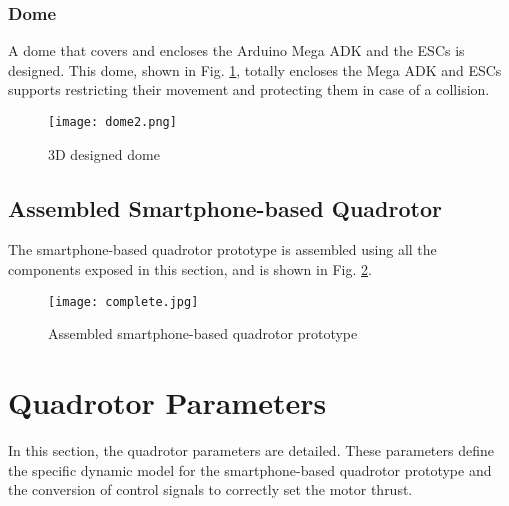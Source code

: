 \subsubsection{Dome}
A dome that covers and encloses the Arduino Mega ADK and the ESCs is designed. This dome, shown in Fig. \ref{fig:dome}, totally encloses the Mega ADK and ESCs supports restricting their movement and protecting them in case of a collision.
\begin{figure}[H]
	\begin{center}
		\texttt{[image: dome2.png]}    
		\caption{3D designed dome} 
		\label{fig:dome}
	\end{center}
\end{figure}

\subsection{Assembled Smartphone-based Quadrotor}
The smartphone-based quadrotor prototype is assembled using all the components exposed in this section, and is shown in Fig. \ref{fig:completequad}.
\begin{figure}[H]
	\begin{center}
		\texttt{[image: complete.jpg]}    
		\caption{Assembled smartphone-based quadrotor prototype} 
		\label{fig:completequad}
	\end{center}
\end{figure}

\section{Quadrotor Parameters} \label{sec:parameters}
In this section, the quadrotor parameters are detailed. These parameters define the specific dynamic model for the smartphone-based quadrotor prototype and the conversion of control signals to correctly set the motor thrust.
